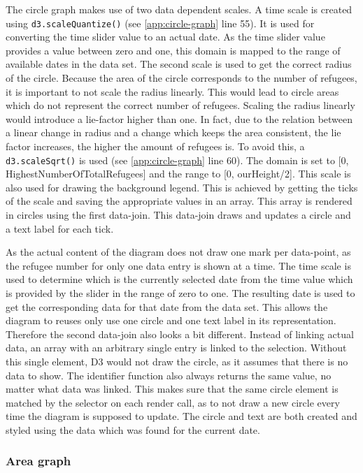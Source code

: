 The circle graph makes use of two data dependent scales. A time scale is created using \texttt{d3.scaleQuantize()} (see \ref{app:circle-graph} line 55). It is used for converting the time slider value to an actual date. As the time slider value provides a value between zero and one, this domain is mapped to the range of available dates in the data set. The second scale is used to get the correct radius of the circle. Because the area of the circle corresponds to the number of refugees, it is important to not scale the radius linearly. This would lead to circle areas which do not represent the correct number of refugees. Scaling the radius linearly would introduce a lie-factor higher than one. In fact, due to the relation between a linear change in radius and a change which keeps the area consistent, the lie factor increases, the higher the amount of refugees is. To avoid this, a \texttt{d3.scaleSqrt()} is used (see \ref{app:circle-graph} line 60). The domain is set to [0, HighestNumberOfTotalRefugees] and the range to [0, ourHeight/2]. This scale is also used for drawing the background legend. This is achieved by getting the ticks of the scale and saving the appropriate values in an array. This array is rendered in circles using the first data-join. This data-join draws and updates a circle and a text label for each tick.

As the actual content of the diagram does not draw one mark per data-point, as the refugee number for only one data entry is shown at a time. The time scale is used to determine which is the currently selected date from the time value which is provided by the slider in the range of zero to one. The resulting date is used to get the corresponding data for that date from the data set. This allows the diagram to reuses only use one circle and one text label in its representation. Therefore the second data-join also looks a bit different. Instead of linking actual data, an array with an arbitrary single entry is linked to the selection. Without this single element, D3 would not draw the circle, as it assumes that there is no data to show. The identifier function also always returns the same value, no matter what data was linked. This makes sure that the same circle element is matched by the selector on each render call, as to not draw a new circle every time the diagram is supposed to update. The circle and text are both created and styled using the data which was found for the current date.

\subsubsection{Area graph}

